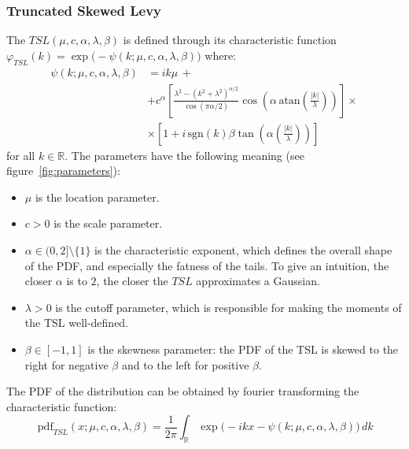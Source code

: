 \documentclass[11pt]{article}
\newcommand{\atan}{\,\text{atan}}
\newcommand{\sgn}{\,\text{sgn}}
\newcommand{\pdf}{\,\text{pdf}}
\begin{document}
        \subsubsection{Truncated Skewed Levy}
        The $TSL(\mu, c, \alpha, \lambda, \beta)$ is defined through  its characteristic function $\varphi_{TSL}(k) = \exp\big(-\psi(k; \mu, c, \alpha, \lambda, \beta)\big)$ where:
        \begin{equation}
            \begin{aligned}
                \psi(k; \mu, c, \alpha, \lambda, \beta) &= ik\mu \,+\\
                                                    & + c^{\alpha}\left[\frac{\lambda^2-(k^2+\lambda^2)^{\alpha/2}}{\cos(\pi \alpha/2)}\cos\left(\alpha \atan \left(\frac{|k|}{\lambda}\right)\right)\right] \times \\
                                                    & \times \left[ 1+ i \sgn(k) \beta \tan \left(\alpha\left(\frac{|k|}{\lambda}\right)\right) \right]
            \end{aligned}\label{eq:char_func}
        \end{equation}
        for all $k \in \mathbb{R}$.
        The parameters have the following meaning (see figure~\ref{fig:parameters}):
        \begin{itemize}
            \item $\mu$ is the location parameter.
            \item $c >0$ is the scale parameter.
            \item $\alpha \in (0,2] \setminus\{1\} $ is the characteristic exponent, which defines the overall shape of the PDF, and especially the fatness of the tails. To give an intuition, the closer $\alpha$ is to $2$, the closer the $TSL$ approximates a Gaussian.
            \item $\lambda > 0$ is the cutoff parameter, which is responsible for making the moments of the TSL well-defined.
            \item $\beta \in [-1, 1]$ is the skewness parameter: the PDF of the TSL is skewed to the right for negative $\beta$ and to the left for positive $\beta$.
        \end{itemize}
        The PDF of the distribution can be obtained by fourier transforming the characteristic function:
        \begin{equation}
            \pdf_{TSL}(x; \mu, c, \alpha, \lambda, \beta) =  \frac{1}{2\pi}\int_{\mathbb R} \exp\big(-ikx-\psi(k; \mu, c, \alpha, \lambda, \beta)\big)\,dk\label{eq:pdf}
        \end{equation}
\end{document}
